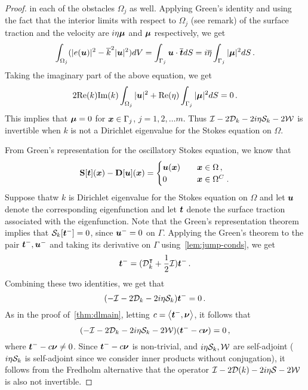 \begin{proof}
in each of the obstacles $\Omega_{j}$ as well.
Applying Green's identity and using the fact that 
the interior limits with respect to $\Omega_{j}$ (see remark)
of the surface traction and the velocity
are $i\eta {\boldsymbol \mu}$ and ${\boldsymbol \mu}$ respectively, we get
\begin{equation}
\int_{\Omega_{j}} (|e({\boldsymbol u})|^{2} - \overline{k}^{2} |{\boldsymbol u}|^2) dV 
= \int_{\Gamma_{j}} {\boldsymbol u} \cdot \overline{{\boldsymbol t}} dS = 
i\overline{\eta}\int_{\Gamma_{j}} |{\boldsymbol \mu}|^2 dS \, .
\end{equation}
Taking the imaginary part of the above equation, we get
\begin{equation}
2 \text{Re}(k) \text{Im}(k) \int_{\Omega_{j}} |{\boldsymbol u}|^2 + \text{Re}(\eta)
\int_{\Gamma_{j}} |{\boldsymbol \mu}|^2 dS = 0 \, .
\end{equation}
This implies that ${\boldsymbol \mu}=0$ for ${\boldsymbol x} \in \Gamma_{j}$, $j=1,2,\ldots m$. 
Thus $\mathcal I - 2{\mathcal D}_{k} -2i\eta{\mathcal S}_{k} -2{\mathcal W}$ is invertible when $k$ 
is not a Dirichlet eigenvalue for the Stokes equation on $\Omega$.


From Green's representation for the oscillatory Stokes equation, 
we know that 
  \begin{equation} \label{eq:rep-theorem}
    {\bf S} [{\boldsymbol t}]({\boldsymbol x}) - {\bf D}[{\boldsymbol u}]({\boldsymbol x}) = \begin{cases} 
    {\boldsymbol u}({\boldsymbol x}) &\quad {\boldsymbol x} \in \Omega \, , \\
    0 &\quad {\boldsymbol x} \in \Omega^{C} \; .
    \end{cases}
  \end{equation}
Suppose thatw $k$ is Dirichlet eigenvalue for the Stokes equation on $\Omega$
and let ${\boldsymbol u}$ denote the corresponding eigenfunction and let ${\boldsymbol t}$ denote
the surface traction associated with the eigenfunction.
Note that the Green's representation theorem implies that 
${\mathcal S}_{k}[{\boldsymbol t}^{-}] = 0$, since ${\boldsymbol u}^{-}=0$ on $\Gamma$. 
Applying the Green's theorem to the pair ${\boldsymbol t}^{-}, {\boldsymbol u}^{-}$ and taking 
its derivative on $\Gamma$ using~\cref{lem:jump-conds}, we get
\begin{equation}
{\boldsymbol t}^{-} = ({\mathcal D}^{\intercal}_{k} + \frac{1}{2} \mathcal I) {\boldsymbol t}^{-} \, . 
\end{equation}
Combining these two identities, we get
that
\begin{equation}
(-\mathcal I - 2{\mathcal D}_{k} -2i\eta {\mathcal S}_{k}) {\boldsymbol t}^{-} = 0 \, .
\end{equation}
As in the proof of~\cref{thm:dlmain}, letting $c = \left< {\boldsymbol t}^{-} ,{\boldsymbol \nu} \right>$, 
it follows that
\begin{equation}
(-\mathcal I - 2{\mathcal D}_{k} - 2i \eta {\mathcal S}_{k} - 2{\mathcal W}) ({\boldsymbol t}^{-} - c{\boldsymbol \nu}) = 0 \, ,
\end{equation}
where ${\boldsymbol t}^{-} - c{\boldsymbol \nu} \neq 0$.
Since ${\boldsymbol t}^{-} - c{\boldsymbol \nu}$ is non-trivial, and $i\eta {\mathcal S}_{k}, {\mathcal W}$ are self-adjoint ($i\eta {\mathcal S}_{k}$ 
is self-adjoint since we consider inner products without conjugation), 
it follows from the Fredholm alternative 
that the operator $\mathcal I - 2{\mathcal D}(k) -2i\eta {\mathcal S} - 2{\mathcal W}$ is also not invertible.
\end{proof}

